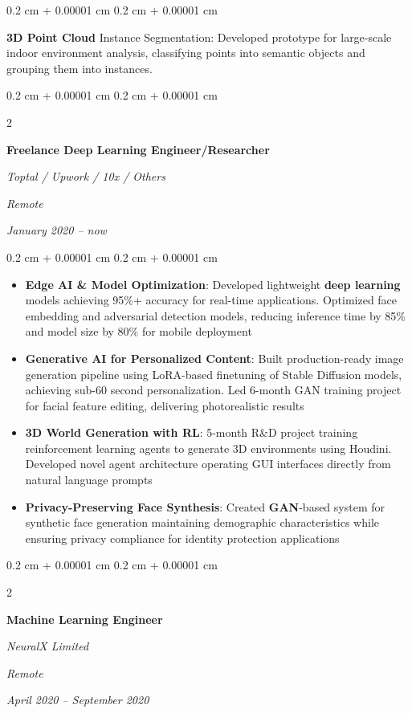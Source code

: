 \documentclass[10pt, letterpaper]{article}
\newenvironment{highlights}{
	\begin{itemize}[
		topsep=0.10 cm,
		parsep=0.10 cm,
		partopsep=0pt,
		itemsep=0pt,
		leftmargin=0.4 cm + 10pt
	]
	}{
	\end{itemize}
} %
\newenvironment{onecolentry}{
	\begin{adjustwidth}{
		0.2 cm + 0.00001 cm
	}{
		0.2 cm + 0.00001 cm
	}
	}{
	\end{adjustwidth}
} %
\newenvironment{twocolentry}[2][]{
	\onecolentry
	\def\secondColumn{#2}
	\setcolumnwidth{\fill, 5.5 cm}
	\begin{paracol}{2}
	}{
		\switchcolumn \raggedleft \secondColumn
	\end{paracol}
	\endonecolentry
} %
\begin{document}
	\vspace{0.10 cm}
	\begin{onecolentry}
		\textbf{3D Point Cloud} Instance Segmentation: Developed prototype for large-scale indoor environment analysis, classifying points into semantic objects and grouping them into instances.
	\end{onecolentry}

	\vspace{0.2 cm}

	\begin{twocolentry}{
		\textit{Remote}
		
		\textit{January 2020 – now}}
		\textbf{Freelance Deep Learning Engineer/Researcher}

		\textit{Toptal / Upwork / 10x / Others}
	\end{twocolentry}

	\vspace{0.10 cm}
	\begin{onecolentry}
		\begin{highlights}
			\item \textbf{Edge AI \& Model Optimization}: Developed lightweight \textbf{deep learning} models achieving 95\%+ accuracy for real-time applications. Optimized face embedding and adversarial detection models, reducing inference time by 85\% and model size by 80\% for mobile deployment
			\item \textbf{Generative AI for Personalized Content}: Built production-ready image generation pipeline using LoRA-based finetuning of Stable Diffusion models, achieving sub-60 second personalization. Led 6-month GAN training project for facial feature editing, delivering photorealistic results
			\item \textbf{3D World Generation with RL}: 5-month R\&D project training reinforcement learning agents to generate 3D environments using Houdini. Developed novel agent architecture operating GUI interfaces directly from natural language prompts
			\item \textbf{Privacy-Preserving Face Synthesis}: Created \textbf{GAN}-based system for synthetic face generation maintaining demographic characteristics while ensuring privacy compliance for identity protection applications
		\end{highlights}
	\end{onecolentry}

	\vspace{0.2 cm}

	\begin{twocolentry}{
		\textit{Remote}
		
		\textit{April 2020 – September 2020}}
		\textbf{Machine Learning Engineer}
		
		\textit{NeuralX Limited}
	\end{twocolentry}
\end{document}
